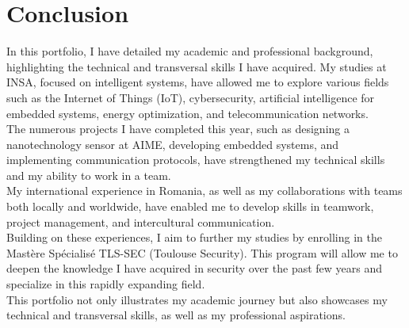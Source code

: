 \chapter{Conclusion}





\indent \indent In this portfolio, I have detailed my academic and professional background, highlighting the technical and transversal skills I have acquired. My studies at INSA, focused on intelligent systems, have allowed me to explore various fields such as the Internet of Things (IoT), cybersecurity, artificial intelligence for embedded systems, energy optimization, and telecommunication networks.
\\

The numerous projects I have completed this year, such as designing a nanotechnology sensor at AIME, developing embedded systems, and implementing communication protocols, have strengthened my technical skills and my ability to work in a team.
\\

My international experience in Romania, as well as my collaborations with teams both locally and worldwide, have enabled me to develop skills in teamwork, project management, and intercultural communication.
\\
Building on these experiences, I aim to further my studies by enrolling in the Mastère Spécialisé TLS-SEC (Toulouse Security). This program will allow me to deepen the knowledge I have acquired in security over the past few years and specialize in this rapidly expanding field.
\\

This portfolio not only illustrates my academic journey but also showcases my technical and transversal skills, as well as my professional aspirations.